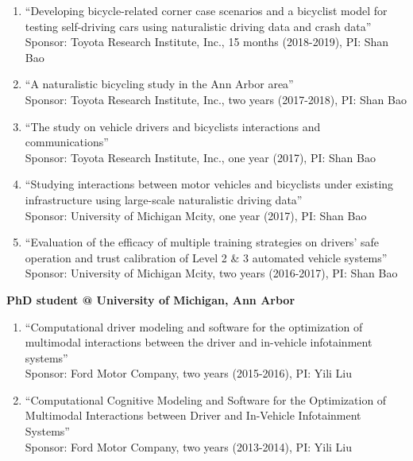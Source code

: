 \documentclass[11pt]{article}
\newenvironment{main}
{\begin{adjustwidth}{3em}{}}
{\end{adjustwidth}}
\begin{document}
\begin{main}
\begin{enumerate}
    \item “Developing bicycle-related corner case scenarios and a bicyclist model for testing self-driving cars using naturalistic driving data and crash data” \\
        Sponsor: Toyota Research Institute, Inc., 15 months (2018-2019), PI: Shan Bao
    \item “A naturalistic bicycling study in the Ann Arbor area” \\
        Sponsor: Toyota Research Institute, Inc., two years (2017-2018), PI: Shan Bao
    \item “The study on vehicle drivers and bicyclists interactions and communications” \\
        Sponsor: Toyota Research Institute, Inc., one year (2017), PI: Shan Bao
    \item “Studying interactions between motor vehicles and bicyclists under existing infrastructure using large-scale naturalistic driving data” \\
        Sponsor: University of Michigan Mcity, one year (2017), PI: Shan Bao
    \item “Evaluation of the efficacy of multiple training strategies on drivers’ safe operation and trust calibration of Level 2 \& 3 automated vehicle systems” \\
        Sponsor: University of Michigan Mcity, two years (2016-2017), PI: Shan Bao
\end{enumerate}

\textbf{PhD student @ University of Michigan, Ann Arbor}
\begin{enumerate}
    \item “Computational driver modeling and software for the optimization of multimodal interactions between the driver and in-vehicle infotainment systems” \\
        Sponsor: Ford Motor Company, two years (2015-2016), PI: Yili Liu
    \item “Computational Cognitive Modeling and Software for the Optimization of Multimodal Interactions between Driver and In-Vehicle Infotainment Systems” \\
        Sponsor: Ford Motor Company, two years (2013-2014), PI: Yili Liu
\end{enumerate}


\end{main}
\end{document}

